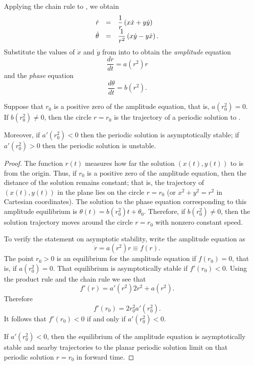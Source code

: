 \documentclass{ximera}
\begin{document}
Applying the chain rule to , we obtain 
\arraystart
\begin{equation}  \label{e:polarder}
\begin{array}{rcl}
\dot{r} & = & \displaystyle\frac{1}{r}\left(x\dot{x} + y\dot{y}\right)\\ 
\dot{\theta} & = & \displaystyle\frac{1}{r^2}\left(x\dot{y}-y\dot{x}\right).
\end{array}
\end{equation}
\arrayfinish
Substitute the values of $\dot{x}$ and $\dot{y}$ from  into 
 to obtain the 
{\em amplitude\/} equation
\begin{equation} \label{e:amplitude}
\frac{dr}{dt}  =  a(r^2) r
\end{equation}
and the {\em phase\/} equation
\begin{equation} \label{e:phase}
\frac{d\theta}{dt} =  b(r^2).
\end{equation}

\begin{prop}
Suppose that $r_0$ is a positive zero of the amplitude equation, that is,
$a(r_0^2)=0$.  If $b(r_0^2)\neq 0$, then the circle $r=r_0$ is the
trajectory of a periodic solution to .  

Moreover, if $a'(r^2_0)<0$ then the periodic solution is asymptotically 
stable; if $a'(r^2_0)>0$ then the periodic solution is unstable.
\end{prop}

\begin{proof}  The function $r(t)$ measures how far the solution $(x(t),y(t))$ to
 is from the origin.  Thus, if $r_0$ is a positive zero of the 
amplitude equation, then the distance of the solution remains constant; that
is, the trajectory of $(x(t),y(t))$ in the plane lies on the circle $r=r_0$
(or $x^2+y^2=r^2$ in Cartesian coordinates).  The solution to the phase 
equation corresponding to this amplitude equilibrium is 
$\theta(t)=b(r_0^2)t+\theta_0$.  Therefore, if $b(r_0^2)\neq 0$, then the 
solution trajectory moves around the circle $r=r_0$ with nonzero constant 
speed.

To verify the statement on asymptotic stability, write the amplitude 
equation as 
\[
\dot{r} = a(r^2)r \equiv f(r).
\]
The point $r_0>0$ is an equilibrium for the amplitude equation if $f(r_0)=0$, 
that is, if $a(r_0^2)=0$.  That equilibrium is asymptotically stable if 
$f'(r_0)<0$.  Using the product rule and the chain rule we see that 
\[
f'(r) = a'(r^2)2r^2 +a(r^2).
\]
Therefore
\[
f'(r_0) = 2r_0^2a'(r_0^2).
\]
It follows that $f'(r_0)<0$ if and only if $a'(r_0^2)<0$.
  
If $a'(r^2_0)<0$, then the equilibrium of the amplitude equation is 
asymptotically stable and nearby trajectories to the planar periodic solution
limit on that periodic solution $r=r_0$ in forward time.  \end{proof} 
\end{document}
